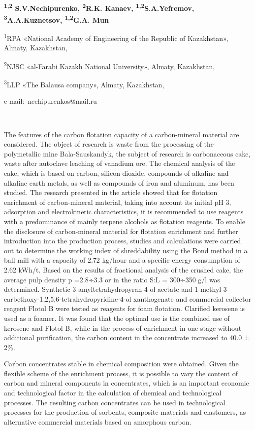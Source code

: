 ~

\textbf{\textsuperscript{1,2} S.V.Nechipurenko, \textsuperscript{2}R.K.
Kanaev, \textsuperscript{1,2}S.A.Yefremov,
\textsuperscript{3}A.A.Kuznetsov, \textsuperscript{1,2}G.A. Mun}

\textsuperscript{1}RPA «National Academy of Engineering of the Republic
of Kazakhstan», Almaty, Kazakhstan,

\textsuperscript{2}NJSC «al-Farabi Kazakh National University», Almaty,
Kazakhstan,

\textsuperscript{3}LLP «The Balausa company», Almaty, Kazakhstan,

e-mail:~nechipurenkos@mail.ru

~

The features of the carbon flotation capacity of a carbon-mineral
material are considered. The object of research is waste from the
processing of the polymetallic mine Bala-Sauskandyk, the subject of
research is carbonaceous cake, waste after autoclave leaching of
vanadium ore. The chemical analysis of the cake, which is based on
carbon, silicon dioxide, compounds of alkaline and alkaline earth
metals, as well as compounds of iron and aluminum, has been studied. The
research presented in the article showed that for flotation enrichment
of carbon-mineral material, taking into account its initial pH 3,
adsorption and electrokinetic characteristics, it is recommended to use
reagents with a predominance of mainly terpene alcohols as flotation
reagents. To enable the disclosure of carbon-mineral material for
flotation enrichment and further introduction into the production
process, studies and calculations were carried out to determine the
working index of shreddability using the Bond method in a ball mill with
a capacity of 2.72 kg/hour and a specific energy consumption of 2.62
kWh/t. Based on the results of fractional analysis of the crushed cake,
the average pulp density p =2.8÷3.3 or in the ratio S:L = 300÷350 g/l
was determined. Synthetic 3-amyltetrahydropyran-4-ol acetate and
1-methyl-3-carbethoxy-1,2,5,6-tetrahydropyridine-4-ol xanthogenate and
commercial collector reagent Flotol B were tested as reagents for foam
flotation. Clarified kerosene is used as a foamer. It was found that the
optimal use is the combined use of kerosene and Flotol B, while in the
process of enrichment in one stage without additional purification, the
carbon content in the concentrate increased to 40.0 ± 2\%.

Carbon concentrates stable in chemical composition were obtained. Given
the flexible scheme of the enrichment process, it is possible to vary
the content of carbon and mineral components in concentrates, which is
an important economic and technological factor in the calculation of
chemical and technological processes. The resulting carbon concentrates
can be used in technological processes for the production of sorbents,
composite materials and elastomers, as alternative commercial materials
based on amorphous carbon.

